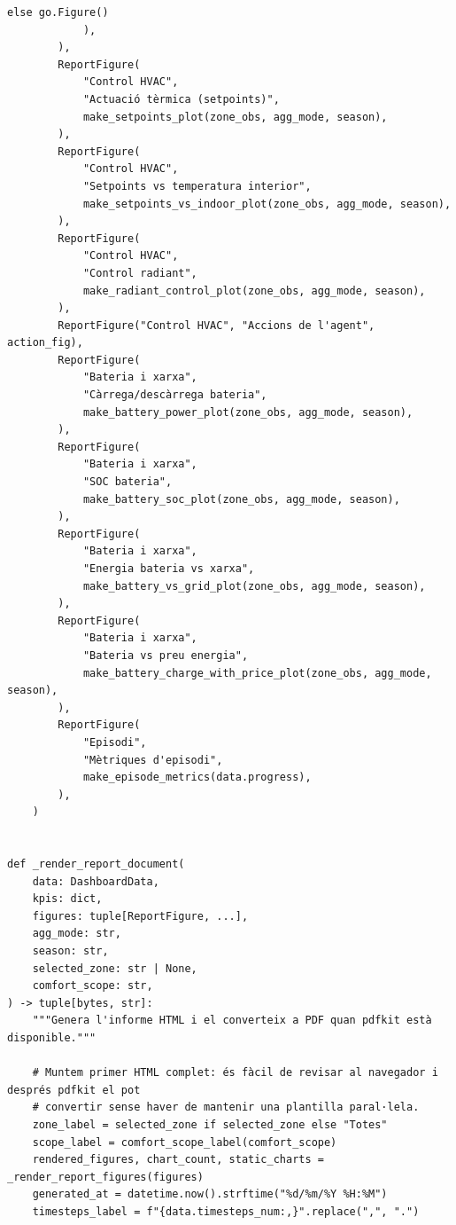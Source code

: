 \documentclass[10pt,a4paper]{article}
\begin{document}
\begin{lstlisting}[style=studioPython,caption={backend/resultats\_report\_backend.py},label={lst:backend-resultats-report-backend-py}]
                else go.Figure()
            ),
        ),
        ReportFigure(
            "Control HVAC",
            "Actuació tèrmica (setpoints)",
            make_setpoints_plot(zone_obs, agg_mode, season),
        ),
        ReportFigure(
            "Control HVAC",
            "Setpoints vs temperatura interior",
            make_setpoints_vs_indoor_plot(zone_obs, agg_mode, season),
        ),
        ReportFigure(
            "Control HVAC",
            "Control radiant",
            make_radiant_control_plot(zone_obs, agg_mode, season),
        ),
        ReportFigure("Control HVAC", "Accions de l'agent", action_fig),
        ReportFigure(
            "Bateria i xarxa",
            "Càrrega/descàrrega bateria",
            make_battery_power_plot(zone_obs, agg_mode, season),
        ),
        ReportFigure(
            "Bateria i xarxa",
            "SOC bateria",
            make_battery_soc_plot(zone_obs, agg_mode, season),
        ),
        ReportFigure(
            "Bateria i xarxa",
            "Energia bateria vs xarxa",
            make_battery_vs_grid_plot(zone_obs, agg_mode, season),
        ),
        ReportFigure(
            "Bateria i xarxa",
            "Bateria vs preu energia",
            make_battery_charge_with_price_plot(zone_obs, agg_mode, season),
        ),
        ReportFigure(
            "Episodi",
            "Mètriques d'episodi",
            make_episode_metrics(data.progress),
        ),
    )


def _render_report_document(
    data: DashboardData,
    kpis: dict,
    figures: tuple[ReportFigure, ...],
    agg_mode: str,
    season: str,
    selected_zone: str | None,
    comfort_scope: str,
) -> tuple[bytes, str]:
    """Genera l'informe HTML i el converteix a PDF quan pdfkit està disponible."""

    # Muntem primer HTML complet: és fàcil de revisar al navegador i després pdfkit el pot
    # convertir sense haver de mantenir una plantilla paral·lela.
    zone_label = selected_zone if selected_zone else "Totes"
    scope_label = comfort_scope_label(comfort_scope)
    rendered_figures, chart_count, static_charts = _render_report_figures(figures)
    generated_at = datetime.now().strftime("%d/%m/%Y %H:%M")
    timesteps_label = f"{data.timesteps_num:,}".replace(",", ".")


\end{lstlisting}
\end{document}
